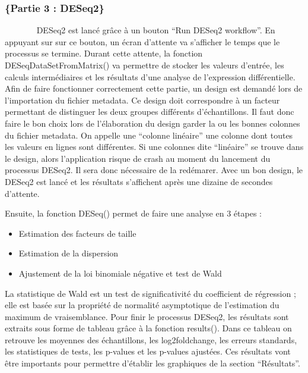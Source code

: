 \documentclass[
  12pt,
]{article}
\begin{document}
\normalsize
{}

\hypertarget{partie-3-deseq2}{%
\subsubsection{\texorpdfstring{\normalsize\{Partie 3 :
DESeq2\}}{\{Partie 3 : DESeq2\}}}\label{partie-3-deseq2}}

~~~~~~~ DESeq2 est lancé grâce à un bouton ``Run DESeq2 workflow''. En
appuyant sur sur ce bouton, un écran d'attente va s'afficher le temps
que le processus se termine. Durant cette attente, la fonction
DESeqDataSetFromMatrix() va permettre de stocker les valeurs d'entrée,
les calculs intermédiaires et les résultats d'une analyse de
l'expression différentielle. Afin de faire fonctionner correctement
cette partie, un design est demandé lors de l'importation du fichier
metadata. Ce design doit correspondre à un facteur permettant de
distinguer les deux groupes différents d'échantillons. Il faut donc
faire le bon choix lors de l'élaboration du design garder la ou les
bonnes colonnes du fichier metadata. On appelle une ``colonne linéaire''
une colonne dont toutes les valeurs en lignes sont différentes. Si une
colonnes dite ``linéaire'' se trouve dans le design, alors l'application
risque de crash au moment du lancement du processus DESeq2. Il sera donc
nécessaire de la redémarer. Avec un bon design, le DESeq2 est lancé et
les résultats s'affichent après une dizaine de secondes d'attente.

\par

Ensuite, la fonction DESeq() permet de faire une analyse en 3 étapes :

\begin{itemize}
\item Estimation des facteurs de taille
\item Estimation de la dispersion
\item Ajustement de la loi binomiale négative et test de Wald
\end{itemize}

La statistique de Wald est un test de significativité du coefficient de
régression ; elle est basée sur la propriété de normalité asymptotique
de l'estimation du maximum de vraisemblance. Pour finir le processus
DESeq2, les résultats sont extraits sous forme de tableau grâce à la
fonction results(). Dans ce tableau on retrouve les moyennes des
échantillons, les log2foldchange, les erreurs standards, les
statistiques de tests, les p-values et les p-values ajustées. Ces
résultats vont être importants pour permettre d'établir les graphiques
de la section ``Résultats''.
\end{document}
